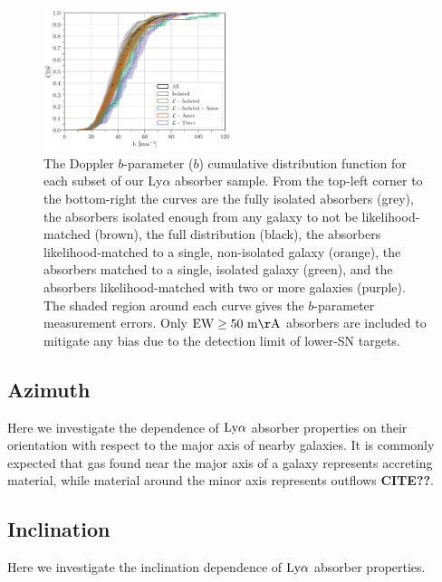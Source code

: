 \documentclass[twocolumn,tighten]{aastex62}
\begin{document}
\begin{figure}[ht!]
        \centering
        \vspace{0pt}
        \includegraphics[width=0.49\textwidth]{hist(b)_all6_bins1_EWcut50-10000_errTrue_dataset.pdf}
        \caption{\small{The Doppler $b$-parameter ($b$) cumulative distribution function for each subset of our Ly$\alpha$ absorber sample. From the top-left corner to the bottom-right the curves are the fully isolated absorbers (grey), the absorbers isolated enough from any galaxy to not be likelihood-matched (brown), the full distribution (black), the absorbers likelihood-matched to a single, non-isolated galaxy (orange), the absorbers matched to a single, isolated galaxy (green), and the absorbers likelihood-matched with two or more galaxies (purple). The shaded region around each curve gives the $b$-parameter measurement errors. Only $\rm EW \ge 50~m\AA$ absorbers are included to mitigate any bias due to the detection limit of lower-SN targets.}}
        \vspace{5pt}
        \label{cdf_b}
\end{figure}



\subsection{Azimuth}
Here we investigate the dependence of $\rm Ly\alpha$ absorber properties on their orientation with respect to the major axis of nearby galaxies. It is commonly expected that gas found near the major axis of a galaxy represents accreting material, while material around the minor axis represents outflows \textbf{CITE??}. 



\subsection{Inclination}

Here we investigate the inclination dependence of $\rm Ly\alpha$ absorber properties.
\end{document}
